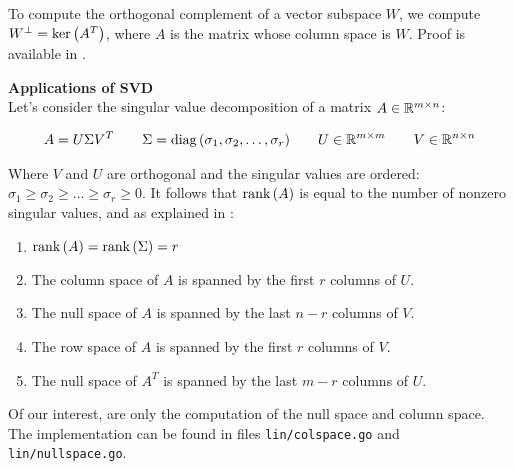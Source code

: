 To compute the orthogonal complement of a vector subspace $W$, we
compute $W^\perp = \text{ker}\left(A^T\right)$, where $A$ is the matrix whose column space 
is $W$. Proof is available in \cite{ila}.




\begin{note}
    \textbf{Applications of SVD} \\
  
    Let's consider the singular value decomposition of a matrix $A \in \mathbb{R}^{m \times n}$:
  
    \begin{equation*}
      \begin{aligned}
        A = U \Sigma V^T & \quad & \Sigma = \text{diag}\left(\sigma_1, \sigma_2, \hdots, \sigma_r  \right) 
         & \quad &  U \in \mathbb{R}^{m \times m} & \quad & V \in \mathbb{R}^{n \times n}
      \end{aligned}
    \end{equation*}
  
    Where $V$ and $U$ are orthogonal and the singular values are ordered: $\sigma_1 \geq \sigma_2 \geq \hdots \geq \sigma_r \geq 0$.
    It follows that $\text{rank}\left(A\right)$ is equal to the number of nonzero singular values, and
    as explained in \cite{svd}:
    
    \begin{enumerate}
      \item  $\text{rank}\left(A\right) = \text{rank}\left(\Sigma\right) = r$
      \item The column space of $A$ is spanned by the first $r$ columns of $U$.
      \item The null space of $A$ is spanned by the last $n − r$ columns of $V$.
      \item The row space of $A$ is spanned by the first $r$ columns of $V$.
      \item The null space of $A^T$ is spanned by the last $m − r$ columns of $U$.
    \end{enumerate}
    
    Of our interest, are only the computation of the null space and column space.
    The implementation 
    can be found in files \texttt{lin/colspace.go} and \texttt{lin/nullspace.go}.
  \end{note}


